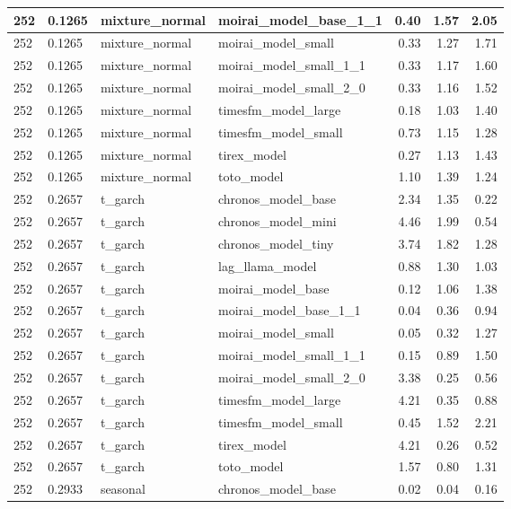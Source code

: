 {\begin{tabular}{llllrrr}
\midrule
252 & 0.1265 & mixture\_normal & moirai\_model\_base\_1\_1 & 0.40 & 1.57 & 2.05 \\
\midrule
252 & 0.1265 & mixture\_normal & moirai\_model\_small & 0.33 & 1.27 & 1.71 \\
\midrule
252 & 0.1265 & mixture\_normal & moirai\_model\_small\_1\_1 & 0.33 & 1.17 & 1.60 \\
\midrule
252 & 0.1265 & mixture\_normal & moirai\_model\_small\_2\_0 & 0.33 & 1.16 & 1.52 \\
\midrule
252 & 0.1265 & mixture\_normal & timesfm\_model\_large & 0.18 & 1.03 & 1.40 \\
\midrule
252 & 0.1265 & mixture\_normal & timesfm\_model\_small & 0.73 & 1.15 & 1.28 \\
\midrule
252 & 0.1265 & mixture\_normal & tirex\_model & 0.27 & 1.13 & 1.43 \\
\midrule
252 & 0.1265 & mixture\_normal & toto\_model & 1.10 & 1.39 & 1.24 \\
\midrule
252 & 0.2657 & t\_garch & chronos\_model\_base & 2.34 & 1.35 & 0.22 \\
\midrule
252 & 0.2657 & t\_garch & chronos\_model\_mini & 4.46 & 1.99 & 0.54 \\
\midrule
252 & 0.2657 & t\_garch & chronos\_model\_tiny & 3.74 & 1.82 & 1.28 \\
\midrule
252 & 0.2657 & t\_garch & lag\_llama\_model & 0.88 & 1.30 & 1.03 \\
\midrule
252 & 0.2657 & t\_garch & moirai\_model\_base & 0.12 & 1.06 & 1.38 \\
\midrule
252 & 0.2657 & t\_garch & moirai\_model\_base\_1\_1 & 0.04 & 0.36 & 0.94 \\
\midrule
252 & 0.2657 & t\_garch & moirai\_model\_small & 0.05 & 0.32 & 1.27 \\
\midrule
252 & 0.2657 & t\_garch & moirai\_model\_small\_1\_1 & 0.15 & 0.89 & 1.50 \\
\midrule
252 & 0.2657 & t\_garch & moirai\_model\_small\_2\_0 & 3.38 & 0.25 & 0.56 \\
\midrule
252 & 0.2657 & t\_garch & timesfm\_model\_large & 4.21 & 0.35 & 0.88 \\
\midrule
252 & 0.2657 & t\_garch & timesfm\_model\_small & 0.45 & 1.52 & 2.21 \\
\midrule
252 & 0.2657 & t\_garch & tirex\_model & 4.21 & 0.26 & 0.52 \\
\midrule
252 & 0.2657 & t\_garch & toto\_model & 1.57 & 0.80 & 1.31 \\
\midrule
252 & 0.2933 & seasonal & chronos\_model\_base & 0.02 & 0.04 & 0.16 \\

\end{tabular}}

